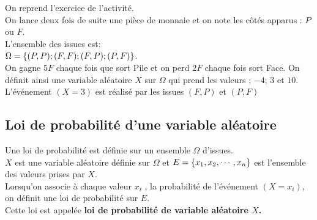    \begin{example}
   On reprend l'exercice de l'activité.\\
On lance deux fois de suite une pièce de monnaie  et on note  les côtés apparus : $ P$ ou $F $.\\L'ensemble des issues est:\\ $ \Omega=\left\{(P,P);(F,F);(F,P);(P,F)\right\} $.\\ On gagne $ 5F $  chaque fois que sort Pile et on perd $ 2F $ chaque fois sort Face. On définit ainsi une variable aléatoire $X $ sur $ \Omega $  qui prend les valeurs ; $-4 $; \;$  3$   et $ 10$.\\L'événement $ (X=3) $ est réalisé par  les issues $ (F,P)$ et $(P,F) $
   \end{example}
   \subsection{Loi de probabilité d'une variable aléatoire}
\begin{definition}
Une loi de probabilité est définie sur un ensemble $ \Omega $  d'issues.\\ $ X $  est une variable aléatoire  définie sur $ \Omega $ et $ E=\left\{x_{1},x_{2},\cdots, x_{n}\right\} $ est l'ensemble des valeurs prises par $ X. $\\Lorsqu'on associe  à chaque valeur  $ x_{i} $ , la probabilité de l'événement  $ (X=x_{i}) $, on définit une loi de probabilité sur $ E. $\\ Cette loi est appelée \textbf{loi de probabilité de variable aléatoire $ X $.}
\end{definition}

